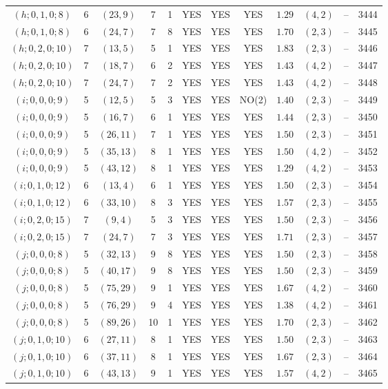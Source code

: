 \begin{longtable}{|c|c|c|c|c|c|c|c|c|c|c|c|}
$(h;0,1,0;8)$ & 6 & $(23,9)$ & 7 & 1 & YES & YES & YES & $1.29$ & $(4,2)$ & -- & 3444\\
$(h;0,1,0;8)$ & 6 & $(24,7)$ & 7 & 8 & YES & YES & YES & $1.70$ & $(2,3)$ & -- & 3445\\
$(h;0,2,0;10)$ & 7 & $(13,5)$ & 5 & 1 & YES & YES & YES & $1.83$ & $(2,3)$ & -- & 3446\\
$(h;0,2,0;10)$ & 7 & $(18,7)$ & 6 & 2 & YES & YES & YES & $1.43$ & $(4,2)$ & -- & 3447\\
$(h;0,2,0;10)$ & 7 & $(24,7)$ & 7 & 2 & YES & YES & YES & $1.43$ & $(4,2)$ & -- & 3448\\
$(i;0,0,0;9)$ & 5 & $(12,5)$ & 5 & 3 & YES & YES & NO(2) & $1.40$ & $(2,3)$ & -- & 3449\\
$(i;0,0,0;9)$ & 5 & $(16,7)$ & 6 & 1 & YES & YES & YES & $1.44$ & $(2,3)$ & -- & 3450\\
$(i;0,0,0;9)$ & 5 & $(26,11)$ & 7 & 1 & YES & YES & YES & $1.50$ & $(2,3)$ & -- & 3451\\
$(i;0,0,0;9)$ & 5 & $(35,13)$ & 8 & 1 & YES & YES & YES & $1.50$ & $(4,2)$ & -- & 3452\\
$(i;0,0,0;9)$ & 5 & $(43,12)$ & 8 & 1 & YES & YES & YES & $1.29$ & $(4,2)$ & -- & 3453\\
$(i;0,1,0;12)$ & 6 & $(13,4)$ & 6 & 1 & YES & YES & YES & $1.50$ & $(2,3)$ & -- & 3454\\
$(i;0,1,0;12)$ & 6 & $(33,10)$ & 8 & 3 & YES & YES & YES & $1.57$ & $(2,3)$ & -- & 3455\\
$(i;0,2,0;15)$ & 7 & $(9,4)$ & 5 & 3 & YES & YES & YES & $1.50$ & $(2,3)$ & -- & 3456\\
$(i;0,2,0;15)$ & 7 & $(24,7)$ & 7 & 3 & YES & YES & YES & $1.71$ & $(2,3)$ & -- & 3457\\
$(j;0,0,0;8)$ & 5 & $(32,13)$ & 9 & 8 & YES & YES & YES & $1.50$ & $(2,3)$ & -- & 3458\\
$(j;0,0,0;8)$ & 5 & $(40,17)$ & 9 & 8 & YES & YES & YES & $1.50$ & $(2,3)$ & -- & 3459\\
$(j;0,0,0;8)$ & 5 & $(75,29)$ & 9 & 1 & YES & YES & YES & $1.67$ & $(4,2)$ & -- & 3460\\
$(j;0,0,0;8)$ & 5 & $(76,29)$ & 9 & 4 & YES & YES & YES & $1.38$ & $(4,2)$ & -- & 3461\\
$(j;0,0,0;8)$ & 5 & $(89,26)$ & 10 & 1 & YES & YES & YES & $1.70$ & $(2,3)$ & -- & 3462\\
$(j;0,1,0;10)$ & 6 & $(27,11)$ & 8 & 1 & YES & YES & YES & $1.50$ & $(2,3)$ & -- & 3463\\
$(j;0,1,0;10)$ & 6 & $(37,11)$ & 8 & 1 & YES & YES & YES & $1.67$ & $(2,3)$ & -- & 3464\\
$(j;0,1,0;10)$ & 6 & $(43,13)$ & 9 & 1 & YES & YES & YES & $1.57$ & $(4,2)$ & -- & 3465
\end{longtable}
